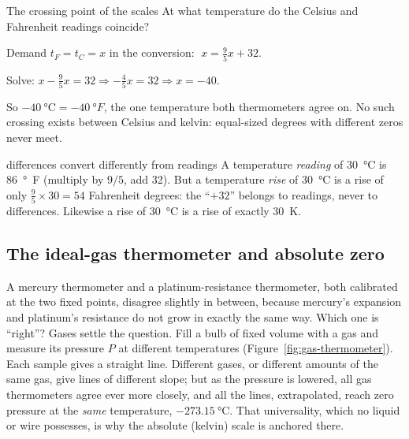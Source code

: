 \begin{exbox}{The crossing point of the scales}\label{ex:scale-crossing}
At what temperature do the Celsius and Fahrenheit readings coincide?

 Demand $t_F = t_C = x$ in the conversion:
$\;x = \tfrac95 x + 32$.

 Solve: $x - \tfrac95x = 32 \Rightarrow -\tfrac45 x = 32 \Rightarrow x = -40$.

So $\SI{-40}{\celsius} = \SI{-40}{\degree F}$, the one temperature both thermometers agree on. No such
crossing exists between Celsius and kelvin: equal-sized degrees with different zeros never meet.
\end{exbox}

\begin{trapbox}{differences convert differently from readings}
A temperature \emph{reading} of \SI{30}{\celsius} is \SI{86}{\degree F} (multiply by $9/5$, add 32).
But a temperature \emph{rise} of \SI{30}{\celsius} is a rise of only $\tfrac95\times30 = 54$
Fahrenheit degrees: the ``$+32$'' belongs to readings, never to differences. Likewise a rise of
\SI{30}{\celsius} is a rise of exactly \SI{30}{K}.
\end{trapbox}

\subsection{The ideal-gas thermometer and absolute zero}

A mercury thermometer and a platinum-resistance thermometer, both calibrated at the two fixed points,
disagree slightly in between, because mercury's expansion and platinum's resistance do not grow in
exactly the same way. Which one is ``right''? Gases settle the question. Fill a bulb of fixed volume
with a gas and measure its pressure $P$ at different temperatures (Figure~\ref{fig:gas-thermometer}).
Each sample gives a straight line. Different gases, or different amounts of the same gas, give lines of
different slope; but as the pressure is lowered, all gas thermometers agree ever more closely, and all
the lines, extrapolated, reach zero pressure at the \emph{same} temperature, $\SI{-273.15}{\celsius}$.
That universality, which no liquid or wire possesses, is why the absolute (kelvin) scale is anchored
there.

\begin{figure}[htbp]
\centering
{}
\end{figure}

